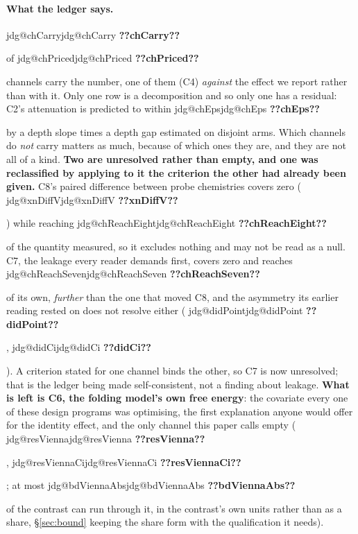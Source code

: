\documentclass[11pt]{article}
\makeatletter
\newcommand{\jdg}[1]{%
  \ifcsname jdg@#1\endcsname\csname jdg@#1\endcsname
  \else\textbf{??#1??}\PackageError{nm}{undefined measured quantity #1}{}\fi}
\makeatother
\begin{document}
\paragraph{What the ledger says.} \jdg{chCarry} of \jdg{chPriced} channels carry the number, one of them (C4) \emph{against} the
effect we report rather than with it. Only one row is a decomposition and so only one has a residual: C2's attenuation is predicted to
within \jdg{chEps} by a depth slope times a depth gap estimated on disjoint arms. Which channels do \emph{not} carry matters as much, because of which ones they are, and they are not
all of a kind. \textbf{Two are unresolved rather than empty, and one was reclassified by applying to it the
criterion the other had already been given.} C8's paired difference between probe chemistries covers
zero (\jdg{xnDiffV}) while reaching \jdg{chReachEight} of the quantity measured, so it excludes
nothing and may not be read as a null. C7, the leakage every reader demands first, covers zero and reaches \jdg{chReachSeven} of its own,
\emph{further} than the one that moved C8, and the asymmetry its earlier reading rested on does not
resolve either (\jdg{didPoint}, \jdg{didCi}). A
criterion stated for one channel binds the other, so C7 is now unresolved; that is the ledger being
made self-consistent, not a finding about leakage. \textbf{What is left is C6, the folding model's own free energy}: the covariate every one of these
design programs was optimising, the first explanation anyone would offer for the identity effect,
and the only channel this paper calls empty (\jdg{resVienna}, \jdg{resViennaCi}; at most
\jdg{bdViennaAbs} of the contrast can run through it, in the contrast's own units rather than as a
share, \S\ref{sec:bound} keeping the share form with the qualification it needs).
\end{document}
